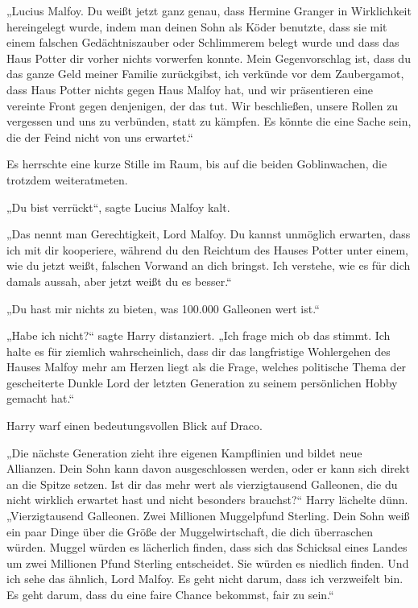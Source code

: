{„Lucius Malfoy. Du weißt jetzt ganz genau, dass Hermine Granger in Wirklichkeit hereingelegt wurde, indem man deinen Sohn als Köder benutzte, dass sie mit einem falschen Gedächtniszauber oder Schlimmerem belegt wurde und dass das Haus Potter dir vorher nichts vorwerfen konnte. Mein Gegenvorschlag ist, dass du das ganze Geld meiner Familie zurückgibst, ich verkünde vor dem Zaubergamot, dass Haus Potter nichts gegen Haus Malfoy hat, und wir präsentieren eine vereinte Front gegen denjenigen, der das tut. Wir beschließen, unsere Rollen zu vergessen und uns zu verbünden, statt zu kämpfen. Es könnte die eine Sache sein, die der Feind nicht von uns erwartet.“

Es herrschte eine kurze Stille im Raum, bis auf die beiden Goblinwachen, die trotzdem weiteratmeten.

„Du bist verrückt“, sagte Lucius Malfoy kalt.

„Das nennt man Gerechtigkeit, Lord Malfoy. Du kannst unmöglich erwarten, dass ich mit dir kooperiere, während du den Reichtum des Hauses Potter unter einem, wie du jetzt weißt, falschen Vorwand an dich bringst. Ich verstehe, wie es für dich damals aussah, aber jetzt weißt du es besser.“

„Du hast mir nichts zu bieten, was 100.000 Galleonen wert ist.“

„Habe ich nicht?“ sagte Harry distanziert. „Ich frage mich ob das stimmt. Ich halte es für ziemlich wahrscheinlich, dass dir das langfristige Wohlergehen des Hauses Malfoy mehr am Herzen liegt als die Frage, welches politische Thema der gescheiterte Dunkle Lord der letzten Generation zu seinem persönlichen Hobby gemacht hat.“

Harry warf einen bedeutungsvollen Blick auf Draco.

„Die nächste Generation zieht ihre eigenen Kampflinien und bildet neue Allianzen. Dein Sohn kann davon ausgeschlossen werden, oder er kann sich direkt an die Spitze setzen. Ist dir das mehr wert als vierzigtausend Galleonen, die du nicht wirklich erwartet hast und nicht besonders brauchst?“ Harry lächelte dünn. „Vierzigtausend Galleonen. Zwei Millionen Muggelpfund Sterling. Dein Sohn weiß ein paar Dinge über die Größe der Muggelwirtschaft, die dich überraschen würden. Muggel würden es lächerlich finden, dass sich das Schicksal eines Landes um zwei Millionen Pfund Sterling entscheidet. Sie würden es niedlich finden. Und ich sehe das ähnlich, Lord Malfoy. Es geht nicht darum, dass ich verzweifelt bin. Es geht darum, dass du eine faire Chance bekommst, fair zu sein.“

}
